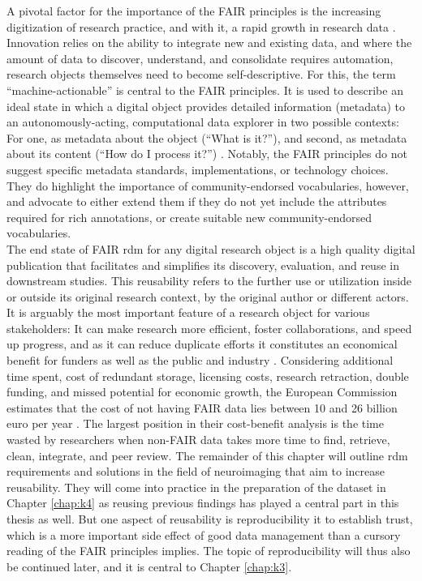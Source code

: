 A pivotal factor for the importance of the FAIR principles is the increasing digitization of research practice, and with it, a rapid growth in research data \citep{dfg}.
Innovation relies on the ability to integrate new and existing data, and where the amount of data to discover, understand, and consolidate requires automation, research objects themselves need to become self-descriptive.
For this, the term ``machine-actionable'' is central to the \gls{FAIR} principles.
It is used to describe an ideal state in which a digital object provides detailed information (metadata) to an autonomously-acting, computational data explorer in two possible contexts: For one, as metadata about the object (``What is it?''), and second, as metadata about its content (``How do I process it?'') \citep{wilkinson2016fair}.
Notably, the \gls{FAIR} principles do not suggest specific metadata standards, implementations, or technology choices.
They do highlight the importance of community-endorsed vocabularies, however, and advocate to either extend them if they do not yet include the attributes required for rich annotations, or create suitable new community-endorsed vocabularies. \\
The end state of FAIR \gls{rdm} for any digital research object is a high quality digital publication that facilitates and simplifies its discovery, evaluation, and reuse in downstream studies.
This reusability refers to the further use or utilization inside or outside its original research context, by the original author or different actors.
It is arguably the most important feature of a research object for various stakeholders: It can make research more efficient, foster collaborations, and speed up progress, and as it can reduce duplicate efforts it constitutes an economical benefit for funders as well as the public and industry \citep{nfdi2022data}.
Considering additional time spent, cost of redundant storage, licensing costs, research retraction, double funding, and missed potential for economic growth, the European Commission estimates that the cost of not having FAIR data lies between 10 and 26 billion euro per year \citep{eu2019FAIR}.
The largest position in their cost-benefit analysis is the time wasted by researchers when non-FAIR data takes more time to find, retrieve, clean, integrate, and peer review.
The remainder of this chapter will outline \gls{rdm} requirements and solutions in the field of neuroimaging that aim to increase reusability.
They will come into practice in the preparation of the dataset in Chapter \ref{chap:k4} as reusing previous findings has played a central part in this thesis as well.
But one aspect of reusability is reproducibility it to establish trust, which is a more important side effect of good data management than a cursory reading of the \gls{FAIR} principles implies.
The topic of reproducibility will thus also be continued later, and it is central to Chapter \ref{chap:k3}.

